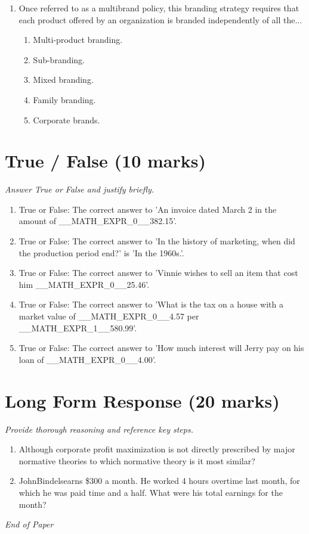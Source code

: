 \documentclass[12pt]{article}
\begin{document}
\begin{enumerate}[label=\arabic*.]
\begin{enumerate}[label=(\alph*)]
    \item \$3,420.75
    \item \$900
\end{enumerate}
\item Once referred to as a multibrand policy, this branding strategy requires that each product offered by an organization is branded independently of all the...
\begin{enumerate}[label=(\alph*)]
    \item Multi-product branding.
    \item Sub-branding.
    \item Mixed branding.
    \item Family branding.
    \item Corporate brands.
\end{enumerate}
\end{enumerate}

\section*{True / False (10 marks)}
\textit{Answer True or False and justify briefly.}
\begin{enumerate}[label=\arabic*.]
\item True or False: The correct answer to 'An invoice dated March 2 in the amount of \_\_MATH\_EXPR\_0\_\_382.15'.
\item True or False: The correct answer to 'In the history of marketing, when did the production period end?' is 'In the 1960s.'.
\item True or False: The correct answer to 'Vinnie wishes to sell an item that cost him \_\_MATH\_EXPR\_0\_\_25.46'.
\item True or False: The correct answer to 'What is the tax on a house with a market value of \_\_MATH\_EXPR\_0\_\_4.57 per \_\_MATH\_EXPR\_1\_\_580.99'.
\item True or False: The correct answer to 'How much interest will Jerry pay on his loan of \_\_MATH\_EXPR\_0\_\_4.00'.
\end{enumerate}

\section*{Long Form Response (20 marks)}
\textit{Provide thorough reasoning and reference key steps.}
\begin{enumerate}[label=\arabic*.]
\item Although corporate profit maximization is not directly prescribed by major normative theories to which normative theory is it most similar?
\item JohnBindelsearns \$300 a month. He worked 4 hours overtime last month, for which he was paid time and a half. What were his total earnings for the month?
\end{enumerate}

\vfill
\noindent\textit{End of Paper}
\end{document}
